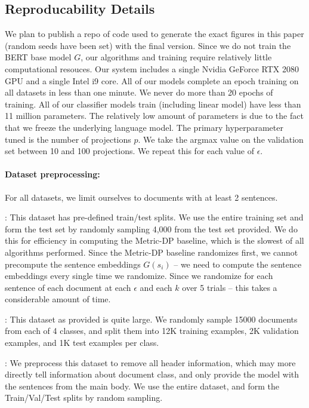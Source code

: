 \subsection{Reproducability Details}
We plan to publish a repo of code used to generate the exact figures in this paper (random seeds have been set) with the final version. Since we do not train the BERT base model $G$, our algorithms and training require relatively little computational resouces. Our system includes a single Nvidia GeForce RTX 2080 GPU and a single Intel i9 core. All of our models complete an epoch training on all datasets in less than one minute. We never do more than 20 epochs of training. All of our classifier models train (including linear model) have less than 11 million parameters. The relatively low amount of parameters is due to the fact that we freeze the underlying language model. The primary hyperparameter tuned is the number of projections $p$. We take the argmax value on the validation set between 10 and 100 projections. We repeat this for each value of $\epsilon$. 

\paragraph{Dataset preprocessing:} For all datasets, we limit ourselves to documents with at least 2 sentences. 

\imdb: This dataset has pre-defined train/test splits. We use the entire training set and form the test set by randomly sampling 4,000 from the test set provided. We do this for efficiency in computing the Metric-DP baseline, which is the slowest of all algorithms performed. Since the Metric-DP baseline randomizes first, we cannot precompute the sentence embeddings $G(s_i)$ -- we need to compute the sentence embeddings every single time we randomize. Since we randomize for each sentence of each document at each $\epsilon$ and each $k$ over 5 trials -- this takes a considerable amount of time. 

\goodreads: This dataset as provided is quite large. We randomly sample 15000 documents from each of 4 classes, and split them into 12K training examples, 2K validation examples, and 1K test examples per class. 

\tnews: We preprocess this dataset to remove all header information, which may more directly tell information about document class, and only provide the model with the sentences from the main body. We use the entire dataset, and form the Train/Val/Test splits by random sampling. 















